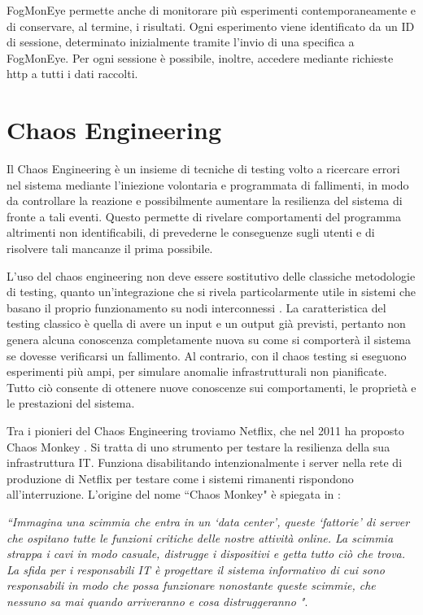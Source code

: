        
        FogMonEye permette anche di monitorare più esperimenti contemporaneamente e di conservare, al termine, i risultati. Ogni esperimento viene identificato da un ID di sessione, determinato inizialmente tramite l'invio di una specifica a FogMonEye. Per ogni sessione è possibile, inoltre, accedere mediante richieste http a tutti i dati raccolti.
    \newpage
    \section{Chaos Engineering}
    Il Chaos Engineering \cite{princofchaos}\cite{gremlinchaos} è un insieme di tecniche di testing volto a ricercare errori nel sistema mediante l’iniezione volontaria e programmata di fallimenti, in modo da controllare la reazione e possibilmente aumentare la resilienza del sistema di fronte a tali eventi. Questo permette di rivelare comportamenti del programma altrimenti non identificabili, di prevederne le conseguenze sugli utenti e di risolvere tali mancanze il prima possibile.
    
    L'uso del chaos engineering non deve essere sostitutivo delle classiche metodologie di testing, quanto un'integrazione che si rivela particolarmente utile in sistemi che basano il proprio funzionamento su nodi interconnessi \cite{queue}. La caratteristica del testing classico è quella di avere un input e un output già previsti, pertanto non genera alcuna conoscenza completamente nuova su come si comporterà il sistema se dovesse verificarsi un fallimento. Al contrario, con il chaos testing si eseguono esperimenti più ampi, per simulare anomalie infrastrutturali non pianificate. Tutto ciò consente di ottenere nuove conoscenze sui comportamenti, le proprietà e le prestazioni del sistema.
    
   Tra i pionieri del Chaos Engineering troviamo Netflix, che nel 2011 ha proposto Chaos Monkey \cite{Netflix}. Si tratta di uno strumento per testare la resilienza della sua infrastruttura IT. Funziona disabilitando intenzionalmente i server nella rete di produzione di Netflix per testare come i sistemi rimanenti rispondono all'interruzione. L'origine del nome ``Chaos Monkey" è spiegata in \cite{Martinez}:
    
    \emph{``Immagina una scimmia che entra in un `data center', queste `fattorie' di server che ospitano tutte le funzioni critiche delle nostre attività online. La scimmia strappa i cavi in modo casuale, distrugge i dispositivi e getta tutto ciò che trova. La sfida per i responsabili IT è progettare il sistema informativo di cui sono responsabili in modo che possa funzionare nonostante queste scimmie, che nessuno sa mai quando arriveranno e cosa distruggeranno "}.
    
